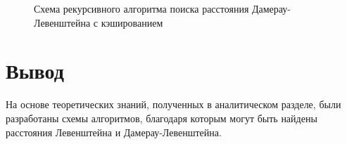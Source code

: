\begin{figure}[h!]
	
		
	\caption{Схема рекурсивного алгоритма поиска расстояния Дамерау-Левенштейна с кэшированием}
		
	\label{fig:dl_cash}
		
\end{figure}


\section*{Вывод}

На основе теоретических знаний, полученных в аналитическом разделе, были разработаны схемы алгоритмов, благодаря которым могут быть найдены расстояния Левенштейна и Дамерау-Левенштейна.
